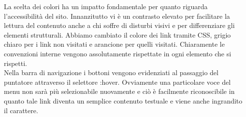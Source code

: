 La scelta dei colori ha un impatto fondamentale per quanto riguarda l’accessibilità del sito. Innanzitutto vi è un contrasto elevato
per facilitare la lettura del contenuto anche a chi soffre di disturbi visivi e per differenziare gli elementi strutturali.
Abbiamo cambiato il colore dei link tramite CSS, grigio chiaro per i link non visitati e arancione per quelli visitati.
Chiaramente le convenzioni interne vengono assolutamente rispettate in ogni elemento che si rispetti.\\
Nella barra di navigazione i bottoni vengono evidenziati al passaggio del puntatore attraverso il selettore
:hover. Ovviamente una particolare voce del menu non sarà più selezionabile nuovamente e ciò è facilmente
riconoscibile in quanto tale link diventa un semplice contenuto testuale e viene anche ingrandito il carattere.